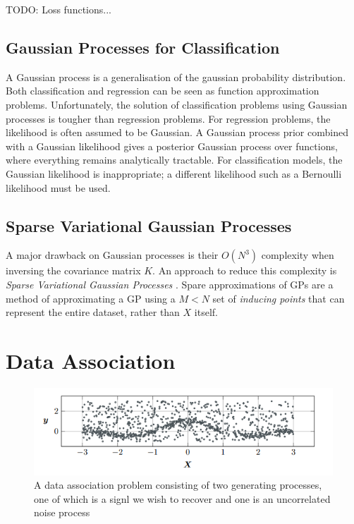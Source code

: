 \documentclass[12pt,a4paper]{report}
\theoremstyle{definition}
\begin{document}
TODO: Loss functions...

\subsection{Gaussian Processes for Classification}

A Gaussian process is a generalisation of the gaussian probability distribution. 
Both classification and regression can be seen as function approximation problems. 
Unfortunately, the solution of classification problems using Gaussian processes is tougher than regression problems. 
For regression problems, the likelihood is often assumed to be Gaussian. 
A Gaussian process prior combined with a Gaussian likelihood gives a posterior Gaussian process over functions, where everything remains analytically tractable. 
For classification models, the Gaussian likelihood is inappropriate; a different likelihood such as a Bernoulli likelihood must be used.

\subsection{Sparse Variational Gaussian Processes}

A major drawback on Gaussian processes is their $O(N^3)$ complexity when inversing the covariance matrix $K$.
An approach to reduce this complexity is \emph{Sparse Variational Gaussian Processes} \citep{Hensman2014}.
Spare approximations of GPs are a method of approximating a GP using a $M < N$ set of \emph{inducing points} that can represent the entire dataset, rather than $X$ itself.

\section{Data Association}

\begin{figure}[H]
    \centering
    \includegraphics[width=\linewidth]{data_association_problem.png}
    \caption{A data association problem consisting of two generating processes, one of which is a signl we wish to recover and one is an uncorrelated noise process \citep{Kaiser2018}}
    \label{fig:DataAssocProblem}
\end{figure}
\end{document}
